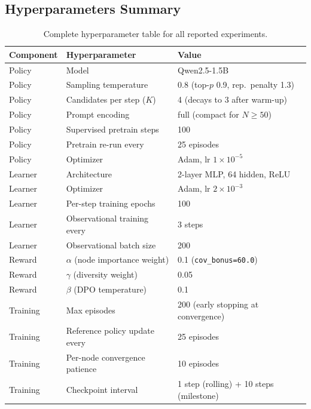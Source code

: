\subsection{Hyperparameters Summary}
\label{app:hyper-summary}

\begin{table}[h]
\centering
\caption{Complete hyperparameter table for all reported experiments.}
\label{tab:hyper-summary}
\small
\begin{tabular}{@{}lll@{}}
\toprule
Component & Hyperparameter & Value \\
\midrule
Policy & Model & Qwen2.5-1.5B \\
Policy & Sampling temperature & 0.8 (top-$p$ 0.9, rep.\ penalty 1.3) \\
Policy & Candidates per step ($K$) & 4 (decays to 3 after warm-up) \\
Policy & Prompt encoding & full (compact for $N\!\geq\!50$) \\
Policy & Supervised pretrain steps & 100 \\
Policy & Pretrain re-run every & 25 episodes \\
Policy & Optimizer & Adam, lr $1 \times 10^{-5}$ \\
\midrule
Learner & Architecture & 2-layer MLP, 64 hidden, ReLU \\
Learner & Optimizer & Adam, lr $2 \times 10^{-3}$ \\
Learner & Per-step training epochs & 100 \\
Learner & Observational training every & 3 steps \\
Learner & Observational batch size & 200 \\
\midrule
Reward & $\alpha$ (node importance weight) & 0.1 (\texttt{cov\_bonus=60.0}) \\
Reward & $\gamma$ (diversity weight) & 0.05 \\
Reward & $\beta$ (DPO temperature) & 0.1 \\
\midrule
Training & Max episodes & 200 (early stopping at convergence) \\
Training & Reference policy update every & 25 episodes \\
Training & Per-node convergence patience & 10 episodes \\
Training & Checkpoint interval & 1 step (rolling) + 10 steps (milestone) \\
\bottomrule
\end{tabular}
\end{table}

